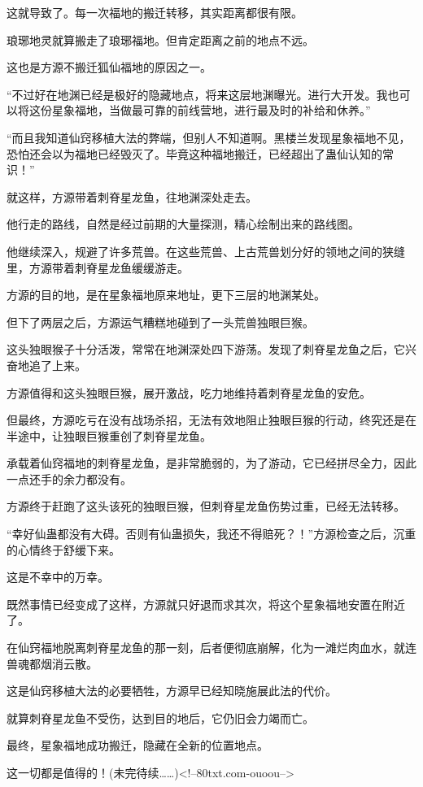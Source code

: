 \begin{this_body}
这就导致了。每一次福地的搬迁转移，其实距离都很有限。

琅琊地灵就算搬走了琅琊福地。但肯定距离之前的地点不远。

这也是方源不搬迁狐仙福地的原因之一。

“不过好在地渊已经是极好的隐藏地点，将来这层地渊曝光。进行大开发。我也可以将这份星象福地，当做最可靠的前线营地，进行最及时的补给和休养。”

“而且我知道仙窍移植大法的弊端，但别人不知道啊。黑楼兰发现星象福地不见，恐怕还会以为福地已经毁灭了。毕竟这种福地搬迁，已经超出了蛊仙认知的常识！”

就这样，方源带着刺脊星龙鱼，往地渊深处走去。

他行走的路线，自然是经过前期的大量探测，精心绘制出来的路线图。

他继续深入，规避了许多荒兽。在这些荒兽、上古荒兽划分好的领地之间的狭缝里，方源带着刺脊星龙鱼缓缓游走。

方源的目的地，是在星象福地原来地址，更下三层的地渊某处。

但下了两层之后，方源运气糟糕地碰到了一头荒兽独眼巨猴。

这头独眼猴子十分活泼，常常在地渊深处四下游荡。发现了刺脊星龙鱼之后，它兴奋地追了上来。

方源值得和这头独眼巨猴，展开激战，吃力地维持着刺脊星龙鱼的安危。

但最终，方源吃亏在没有战场杀招，无法有效地阻止独眼巨猴的行动，终究还是在半途中，让独眼巨猴重创了刺脊星龙鱼。

承载着仙窍福地的刺脊星龙鱼，是非常脆弱的，为了游动，它已经拼尽全力，因此一点还手的余力都没有。

方源终于赶跑了这头该死的独眼巨猴，但刺脊星龙鱼伤势过重，已经无法转移。

“幸好仙蛊都没有大碍。否则有仙蛊损失，我还不得赔死？！”方源检查之后，沉重的心情终于舒缓下来。

这是不幸中的万幸。

既然事情已经变成了这样，方源就只好退而求其次，将这个星象福地安置在附近了。

在仙窍福地脱离刺脊星龙鱼的那一刻，后者便彻底崩解，化为一滩烂肉血水，就连兽魂都烟消云散。

这是仙窍移植大法的必要牺牲，方源早已经知晓施展此法的代价。

就算刺脊星龙鱼不受伤，达到目的地后，它仍旧会力竭而亡。

最终，星象福地成功搬迁，隐藏在全新的位置地点。

这一切都是值得的！(未完待续……)<!--80txt.com-ouoou-->

\end{this_body}

